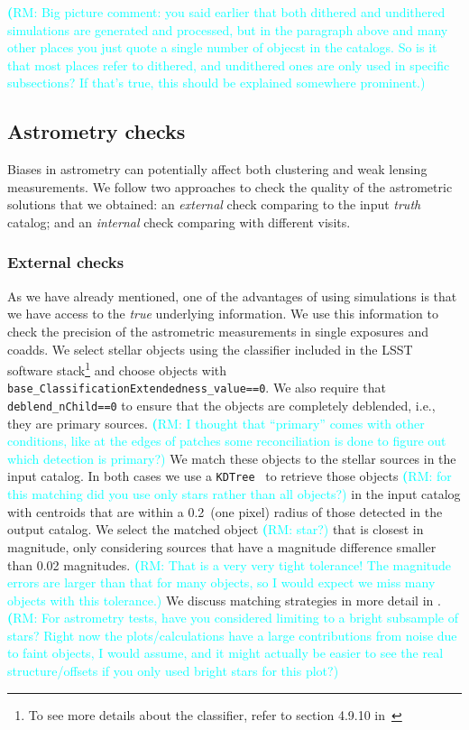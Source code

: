 \documentclass[twocolumn]{aastex62}
\newcommand{\rachel}[1]{{\textcolor{cyan}{{\textbf (RM: #1)}}}}
\begin{document}
\rachel{Big picture comment: you said earlier that both dithered and undithered simulations are generated and processed, but in the paragraph above and many other places you just quote a single number of objecst in the catalogs.  So is it that most places refer to dithered, and undithered ones are only used in specific subsections?  If that's true, this should be explained somewhere prominent.}

\subsection{Astrometry checks}
\label{sec:astrometry_checks}

Biases in astrometry can potentially affect both clustering and weak lensing measurements. We follow two approaches to check the quality of the astrometric solutions that we obtained: an \textit{external} check comparing to the input \textit{truth} catalog; and an \textit{internal} check comparing with different visits.

\subsubsection{External checks}
\label{sec:external_astrometry}

As we have already mentioned, one of the advantages of using simulations is that we have access to the \textit{true} underlying information. We use this information to check the precision of the astrometric measurements in single exposures and coadds. We select stellar objects using the classifier included in the LSST software stack\footnote{To see more details about the classifier, refer to section 4.9.10 in~\citet{2017arXiv170506766B}} and choose objects with \texttt{base\_ClassificationExtendedness\_value==0}.
We also require that \texttt{deblend\_nChild==0} to ensure that the objects are completely deblended, i.e., they are primary sources. \rachel{I thought that ``primary'' comes with other conditions, like at the edges of patches some reconciliation is done to figure out which detection is primary?} We match these objects to the stellar sources in the input catalog. In both cases we use a \texttt{KDTree}~\citep{scikit-learn} to retrieve those objects \rachel{for this matching did you use only stars rather than all objects?} in the input catalog with centroids that are within a 0.2\arcsec\ (one pixel) radius of those detected in the output catalog. We select the matched object \rachel{star?} that is closest in magnitude, only considering sources that have a magnitude difference smaller than 0.02 magnitudes. \rachel{That is a very very tight tolerance!  The magnitude errors are larger than that for many objects, so I would expect we miss many objects with this tolerance.} We discuss matching strategies in more detail in . \rachel{For astrometry tests, have you considered limiting to a bright subsample of stars?  Right now the plots/calculations have a large contributions from noise due to faint objects, I would assume, and it might actually be easier to see the real structure/offsets if you only used bright stars for this plot?}
\end{document}
